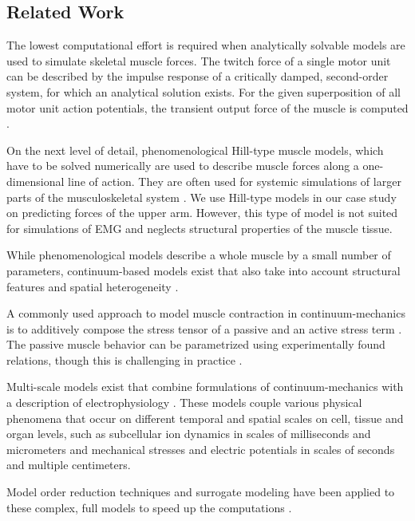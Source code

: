\subsection{Related Work}
The lowest computational effort is required when analytically solvable models are used to simulate skeletal muscle forces. The twitch force of a single motor unit can be described by the impulse response of a critically damped, second-order system, for which an analytical solution exists. For the given superposition of all motor unit action potentials, the transient output force of the muscle is computed  \cite{Cisi2008,Dideriksen2010}.

On the next level of detail, phenomenological Hill-type muscle models, which have to be solved numerically are used to describe muscle forces along a one-dimensional line of action. They are often used for systemic simulations of larger parts of the musculoskeletal system \cite{Zajac1989,OpenSim2007,Hilltype2014,Bayer2017}. We use Hill-type models in our case study on predicting forces of the upper arm. However, this type of model is not suited for simulations of EMG and neglects structural properties of the muscle tissue.

While phenomenological models describe a whole muscle by a small number of parameters, continuum-based models exist that also take into account structural features and spatial heterogeneity \cite{Johansson2000,Blemker2005a,Roehrle2007,Boel2008}.

A commonly used approach to model muscle contraction in continuum-mechanics is to additively compose the stress tensor of a passive and an active stress term \cite{blemker2005three,Johansson2000,Roehrle2008}. The passive muscle behavior can be parametrized using experimentally found relations, though this is challenging in practice \cite{Boel2012,Takaza2013,VanLoocke2008,VanLoocke2006}.

Multi-scale models exist that combine formulations of continuum-mechanics with a description of electrophysiology \cite{Roehrle2008,Roehrle2012,Heidlauf2013,HernandezGascon2013}.
These models couple various physical phenomena that occur on different temporal and spatial scales on cell, tissue and organ levels, such as subcellular ion dynamics in scales of milliseconds and micrometers and mechanical stresses and electric potentials in scales of seconds and multiple centimeters.%

Model order reduction techniques and surrogate modeling have been applied to these complex, full models to speed up the computations \cite{Mordhorst2017,Valentin2018}.

